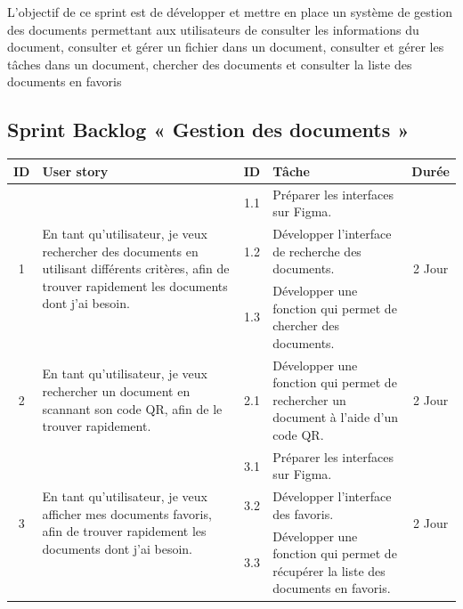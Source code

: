 L'objectif de ce sprint est de développer et mettre en place un système de gestion des documents permettant aux utilisateurs de consulter les informations du document, consulter et gérer un fichier dans un document, consulter et gérer les tâches dans un document, chercher des documents et consulter la liste des documents en favoris

\pagebreak

\subsection{Sprint Backlog « Gestion des documents »}

\begin{adjustwidth}{-1cm}{}
    
    \begin{longtable}{|c|p{6cm}|c|p{6cm}|c|}
      \hline
      \textbf{ID} & \textbf{User story} & \textbf{ID}  & \textbf{Tâche} & \textbf{Durée} \\
      \hline
      \multirow{3}{*}{1} & \multirow{3}{6cm}{En tant qu'utilisateur, je veux rechercher des documents en utilisant différents critères, afin de trouver rapidement les documents dont j'ai besoin.} & 1.1 & Préparer les interfaces sur Figma. & \multirow{3}{*}{2 Jour} \\
      \cline{3-4}
      & & 1.2 & Développer l'interface de recherche des documents. & \\
      \cline{3-4}
      & & 1.3 & Développer une fonction qui permet de chercher des documents. & \\
      \cline{1-5}
      2 & En tant qu'utilisateur, je veux rechercher un document en scannant son code QR, afin de le trouver rapidement. & 2.1 & Développer une fonction qui permet de rechercher un document à l'aide d'un code QR. & 2 Jour \\
      \cline{1-5}
      \multirow{3}{*}{3} & \multirow{3}{6cm}{En tant qu'utilisateur, je veux afficher mes documents favoris, afin de trouver rapidement les documents dont j'ai besoin.}  & 3.1 & Préparer les interfaces sur Figma. & \multirow{3}{*}{2 Jour} \\
      \cline{3-4}
      & & 3.2 & Développer l'interface des favoris. & \\
      \cline{3-4}
      & & 3.3 & Développer une fonction qui permet de récupérer la liste des documents en favoris. & \\

\end{longtable}
\end{adjustwidth}
